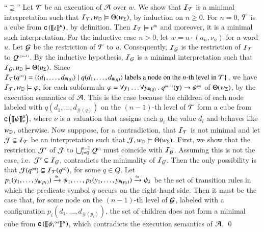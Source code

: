 \documentclass{llncs}
\begin{document}
{  ``$\supseteq$'' Let $\mathcal{T}$ be an execution of $\mathcal{A}$ over $w$. We show
  that $\mathcal{I}_{\mathcal{T}}$ is a minimal interpretation such that $\mathcal{I}_{\mathcal{T}},
  w_{\mathbb{D}} \models \Theta({w_\Sigma})$, by induction on $n \geq
  0$. For $n=0$, $\mathcal{T}$ is a cube from $\mathsf{c}\left({{\bf [\![} \iota {\bf ]\!]}^\mu}\right)$, by
  definition. Then $\mathcal{I}_{\mathcal{T}} \models {\iota}^{\scriptscriptstyle{({0})}}$ and moreover, it
  is a minimal such interpretation. For the inductive case $n > 0$,
  let $w=u\cdot(a_n,\nu_n)$ for a word $u$. Let $\mathcal{G}$ be the
  restriction of $\mathcal{T}$ to $u$. Consequently, $\mathcal{I}_{\mathcal{G}}$ is the restriction
  of $\mathcal{I}_{\mathcal{T}}$ to ${Q}^{\scriptscriptstyle{({\leq n-1})}}$. By the inductive hypothesis,
  $\mathcal{I}_{\mathcal{G}}$ is a minimal interpretation such that \(\mathcal{I}_{\mathcal{G}}, u_{\mathbb{D}}
  \models \Theta({u_\Sigma})\). Since $\mathcal{I}_{\mathcal{T}}({q}^{\scriptscriptstyle{({n})}}) =
  \{ \langle d_1,\ldots,d_{\#(q)} \rangle \mid q(d_1,\ldots,d_{\#(q)})
    \text{ labels a node on the $n$-th level in $\mathcal{T}$} \}$, we have $\mathcal{I}_{\mathcal{T}},
  w_{\mathbb{D}} \models \varphi$, for each subformula $\varphi = \forall y_1
  \ldots \forall y_{\#(q)} ~.~ {q}^{\scriptscriptstyle{({n-1})}}(\mathbf y)
  \rightarrow {\psi}^{\scriptscriptstyle{({n})}}$ of $\Theta({w_\Sigma})$, by the
  execution semantics of $\mathcal{A}$. This is the case because the children
  of each node labeled with $q(d_1,\ldots,d_{\#(q)})$ on the
  $(n-1)$-th level of $\mathcal{T}$ form a cube from
  $\mathsf{c}\left({{\bf [\![} \psi {\bf ]\!]}^\mu_\nu}\right)$, where $\nu$ is a valuation that assigns
  each $y_i$ the value $d_i$ and behaves like $w_{\mathbb{D}}$,
  otherwise. Now supppose, for a contradiction, that $\mathcal{I}_{\mathcal{T}}$ is not
  minimal and let $\mathcal{J} \subsetneq \mathcal{I}_{\mathcal{T}}$ be an interpretation such
  that $\mathcal{J},w_{\mathbb{D}} \models \Theta({w_\Sigma})$. First, we show that
  the restriction $\mathcal{J}'$ of $\mathcal{J}$ to $\bigcup_{i=0}^{n-1} {Q}^{\scriptscriptstyle{({i})}}$
  must coincide with $\mathcal{I}_{\mathcal{G}}$. Assuming this is not the case,
  i.e.\ $\mathcal{J}' \subsetneq \mathcal{I}_{\mathcal{G}}$, contradicts the minimality of
  $\mathcal{I}_{\mathcal{G}}$. Then the only possibility is that $\mathcal{J}({q}^{\scriptscriptstyle{({n})}})
  \subsetneq \mathcal{I}_{\mathcal{T}}({q}^{\scriptscriptstyle{({n})}})$, for some $q \in Q$. Let
  $p_1(y_1,\ldots,y_{\#(p_1)}) \xrightarrow{{\scriptscriptstyle a_n}}_{{\scriptstyle }} \psi_1, \ldots,
  p_k(y_1,\ldots,y_{\#(p_k)}) \xrightarrow{{\scriptscriptstyle a_n}}_{{\scriptstyle }} \psi_k$ be the set of
  transition rules in which the predicate symbol $q$ occurs on the
  right-hand side. Then it must be the case that, for some node on the
  $(n-1)$-th level of $\mathcal{G}$, labeled with a configuration
  $p_i(d_1,\ldots,d_{\#(p_i)})$, the set of children does not form a
  minimal cube from $\mathsf{c}\left({{\bf [\![} {\psi_i}^{\scriptscriptstyle{({n})}} {\bf ]\!]}^\mu}\right)$, which
  contradicts the execution semantics of $\mathcal{A}$. \qed}
\end{document}
